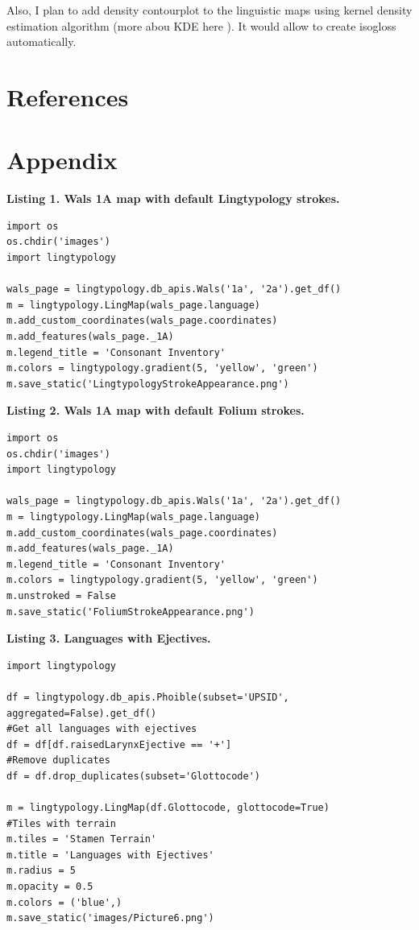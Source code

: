 \documentclass[a4paper,12pt]{article}
\begin{document}
Also, I plan to add density contourplot to the linguistic maps using kernel density estimation algorithm (more abou KDE here \parencite{kde}). It would allow to create isogloss automatically.

\newpage

\section{References}
\printbibliography[type=misc, title=Programming Tools]
\printbibliography[type=manual, title=Documentation]
\printbibliography[type=online, title=Online Recources]
\printbibliography[type=article, title=Articles]
\printbibliography[filter=other, title=Other]
\newpage
\section{Appendix}

\textbf{Listing 1. Wals 1A map with default Lingtypology strokes.}
\begin{lstlisting}
import os
os.chdir('images')
import lingtypology

wals_page = lingtypology.db_apis.Wals('1a', '2a').get_df()
m = lingtypology.LingMap(wals_page.language)
m.add_custom_coordinates(wals_page.coordinates)
m.add_features(wals_page._1A)
m.legend_title = 'Consonant Inventory'
m.colors = lingtypology.gradient(5, 'yellow', 'green')
m.save_static('LingtypologyStrokeAppearance.png')
\end{lstlisting}
\bigskip

\textbf{Listing 2. Wals 1A map with default Folium strokes.}
\begin{lstlisting}
import os
os.chdir('images')
import lingtypology

wals_page = lingtypology.db_apis.Wals('1a', '2a').get_df()
m = lingtypology.LingMap(wals_page.language)
m.add_custom_coordinates(wals_page.coordinates)
m.add_features(wals_page._1A)
m.legend_title = 'Consonant Inventory'
m.colors = lingtypology.gradient(5, 'yellow', 'green')
m.unstroked = False
m.save_static('FoliumStrokeAppearance.png')
\end{lstlisting}
\bigskip

\textbf{Listing 3. Languages with Ejectives.}
\begin{lstlisting}
import lingtypology

df = lingtypology.db_apis.Phoible(subset='UPSID', aggregated=False).get_df()
#Get all languages with ejectives
df = df[df.raisedLarynxEjective == '+']
#Remove duplicates
df = df.drop_duplicates(subset='Glottocode')

m = lingtypology.LingMap(df.Glottocode, glottocode=True)
#Tiles with terrain
m.tiles = 'Stamen Terrain'
m.title = 'Languages with Ejectives'
m.radius = 5
m.opacity = 0.5
m.colors = ('blue',)
m.save_static('images/Picture6.png')
\end{lstlisting}
\end{document}
